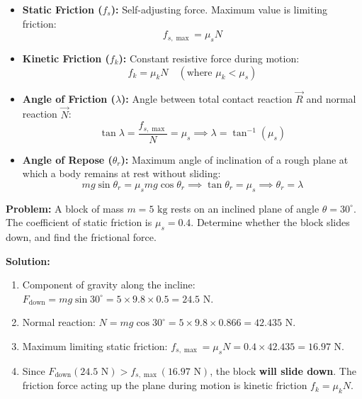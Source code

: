\documentclass[12pt,a4paper]{article}
\begin{document}
\begin{tcolorbox}[formulabox, title={\textbf{Key Laws and Relations of Friction}}]
\begin{itemize}[leftmargin=*, itemsep=2pt]
  \item \textbf{Static Friction ($f_s$):} Self-adjusting force. Maximum value is limiting friction:
  \begin{equation}
  f_{s,\max} = \mu_s N
  \end{equation}
  \item \textbf{Kinetic Friction ($f_k$):} Constant resistive force during motion:
  \begin{equation}
  f_k = \mu_k N \quad (\text{where } \mu_k < \mu_s)
  \end{equation}
  \item \textbf{Angle of Friction ($\lambda$):} Angle between total contact reaction $\vec{R}$ and normal reaction $\vec{N}$:
  \begin{equation}
  \tan \lambda = \frac{f_{s,\max}}{N} = \mu_s \implies \lambda = \tan^{-1}(\mu_s)
  \end{equation}
  \item \textbf{Angle of Repose ($\theta_r$):} Maximum angle of inclination of a rough plane at which a body remains at rest without sliding:
  \begin{equation}
  m g \sin \theta_r = \mu_s m g \cos \theta_r \implies \tan \theta_r = \mu_s \implies \theta_r = \lambda
  \end{equation}
\end{itemize}
\end{tcolorbox}

\begin{tcolorbox}[examplebox, title={\textbf{Solved Problem 1: Block on an Inclined Plane with Friction}}]
\textbf{Problem:} A block of mass $m = 5\text{ kg}$ rests on an inclined plane of angle $\theta = 30^\circ$. The coefficient of static friction is $\mu_s = 0.4$. Determine whether the block slides down, and find the frictional force.

\textbf{Solution:}\par\noindent
\begin{enumerate}[leftmargin=*, itemsep=2pt]
  \item Component of gravity along the incline: $F_{\text{down}} = m g \sin 30^\circ = 5 \times 9.8 \times 0.5 = 24.5\text{ N}$.
  \item Normal reaction: $N = m g \cos 30^\circ = 5 \times 9.8 \times 0.866 = 42.435\text{ N}$.
  \item Maximum limiting static friction: $f_{s,\max} = \mu_s N = 0.4 \times 42.435 = 16.97\text{ N}$.
  \item Since $F_{\text{down}} (24.5\text{ N}) > f_{s,\max} (16.97\text{ N})$, the block \textbf{will slide down}. The friction force acting up the plane during motion is kinetic friction $f_k = \mu_k N$.
\end{enumerate}
\end{tcolorbox}
\end{document}
